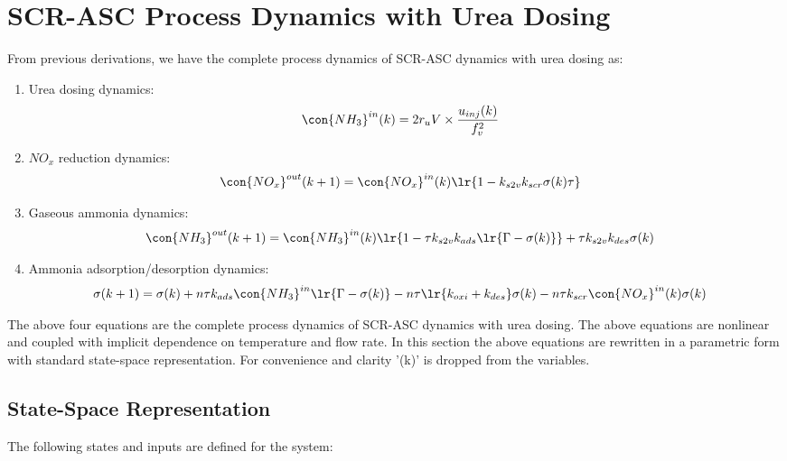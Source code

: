 \newpage
\section{SCR-ASC Process Dynamics with Urea Dosing \label{sec::proc_dyn}}
From previous derivations, we have the complete process dynamics of SCR-ASC
dynamics with urea dosing as:

\begin{enumerate}
    \item Urea dosing dynamics:
    \begin{align*}
    \con{NH_3}^{in} (k) &= 2r_u V \times \frac{u_{inj}(k)}{f_v^2}
    \end{align*}

    \item $NO_x$ reduction dynamics:
    \begin{align*}
    \con{NO_x}^{out} (k + 1) &= \con{NO_x}^{in} (k) \lr{1 - k_{s2v} k_{scr} \sigma(k) \tau}
    \end{align*}

    \item Gaseous ammonia dynamics:
    \begin{align*}
    \con{NH_3}^{out} (k + 1) &= \con{NH_3}^{in}(k) \lr{1 - \tau k_{s2v}k_{ads} \lr{\Gamma - \sigma(k)}} + \tau k_{s2v} k_{des} \sigma(k)
    \end{align*}

    \item Ammonia adsorption/desorption dynamics:
    \begin{align*}
        \sigma(k + 1) &= \sigma(k)
        + n\tau k_{ads} \con{NH_3}^{in} \lr{\Gamma - \sigma(k)}
        - n \tau \lr{k_{oxi} + k_{des}} \sigma(k)
        - n \tau k_{scr} \con{NO_x}^{in}(k) \sigma(k)
    \end{align*}
\end{enumerate}

The above four equations are the complete process dynamics of SCR-ASC dynamics
with urea dosing. The above equations are nonlinear and coupled with implicit
dependence on temperature and flow rate. In this section the above equations are
rewritten in a parametric form with standard state-space representation. For
convenience and clarity '(k)' is dropped from the variables.

\subsection{State-Space Representation}
The following states and inputs are defined for the system:

